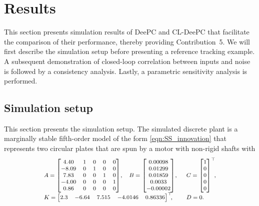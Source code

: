 \section{Results}\label{sec:results}
\noindent This section presents simulation results of \ac{DeePC} and \ac{CL-DeePC} that facilitate the comparison of their performance, thereby providing Contribution~5. We will first describe the simulation setup before presenting a reference tracking example. A subsequent demonstration of closed-loop correlation between inputs and noise is followed by a consistency analysis. Lastly, a parametric sensitivity analysis is performed.
\subsection{Simulation setup}\label{sec:simulation_setup}
\noindent This section presents the simulation setup. The simulated discrete plant is a marginally stable fifth-order 
model of the form \eqref{eqn:SS_innovation} that represents two circular plates that are spun by a motor with non-rigid shafts with \citep{Favoreel1999b}
\begin{align}\label{eq:SysFavoreel}
\scriptsize
\begin{array}{lll}
    A = \begin{bmatrix}
        4.40 & 1 & 0 & 0 & 0\\
       -8.09 & 0 & 1 & 0 & 0\\
        7.83 & 0 & 0 & 1 & 0\\
       -4.00 & 0 & 0 & 0 & 1\\
        0.86 & 0 & 0 & 0 & 0
    \end{bmatrix}\!,&
    B = \begin{bmatrix}
        0.00098\\
        0.01299\\
        0.01859\\
        0.0033\\
       -0.00002
    \end{bmatrix}\!,&C = \begin{bmatrix}
        1 \\ 0 \\ 0\\ 0\\ 0
    \end{bmatrix}^\top\mkern-7mu,\\
    K = \begin{bmatrix}
        2.3 & -6.64 & 7.515 & -4.0146 & 0.86336
    \end{bmatrix}^\top\mkern-7mu,\span
    &D=0.
\end{array}
\end{align}

